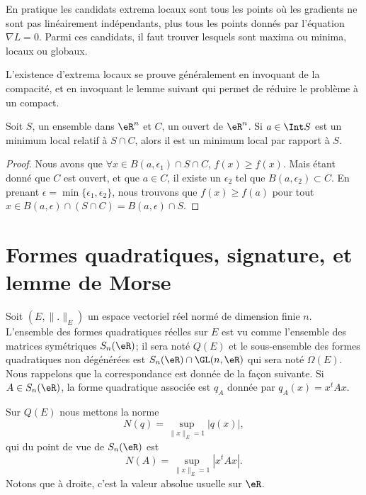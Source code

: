 En pratique les candidats extrema locaux sont tous les points où les gradients ne sont pas linéairement indépendants, plus tous les points donnés par l'équation $\nabla L=0$. Parmi ces candidats, il faut trouver lesquels sont maxima ou minima, locaux ou globaux.

L'existence d'extrema locaux se prouve généralement en invoquant de la compacité, et en invoquant le lemme suivant qui permet de réduire le problème à un compact.

\begin{lemma}		\label{LemmeMinSCimpliqueS}
	Soit $S$, un ensemble dans $\eR^n$ et $C$, un ouvert de $\eR^n$. Si $a\in\Int S$ est un minimum local relatif à $S\cap C$, alors il est un minimum local par rapport à $S$.
\end{lemma}

\begin{proof}
	Nous avons que $\forall x\in B(a,\epsilon_1)\cap S\cap C$, $f(x)\geq f(x)$. Mais étant donné que $C$ est ouvert, et que $a\in C$, il existe un $\epsilon_2$ tel que $B(a,\epsilon_2)\subset C$. En prenant $\epsilon=\min\{ \epsilon_1,\epsilon_2 \}$, nous trouvons que $f(x)\geq f(a)$ pour tout $x\in B(a,\epsilon)\cap(S\cap C)=B(a,\epsilon)\cap S$.
\end{proof}

\section{Formes quadratiques, signature, et lemme de Morse}

Soit \( (E,\| . \|_E)\) un espace vectoriel réel normé de dimension finie \( n\). L'ensemble des formes quadratiques réelles sur \( E\) est vu comme l'ensemble des matrices symétriques \( S_n(\eR)\); il sera noté \( Q(E)\) et le sous-ensemble des formes quadratiques non dégénérées est \( S_n(\eR)\cap\GL(n,\eR)\) qui sera noté \( \Omega(E)\). Nous rappelons que la correspondance est donnée de la façon suivante. Si \( A\in S_n(\eR)\), la forme quadratique associée est \( q_A\) donnée par \( q_A(x)=x^tAx\).

Sur \( Q(E)\) nous mettons la norme
\begin{equation}
    N(q)=\sup_{\| x \|_E=1}| q(x) |,
\end{equation}
qui du point de vue de \( S_n(\eR)\) est
\begin{equation}    \label{EqDOgBNAg}
    N(A)=\sup_{\| x \|_E=1}| x^tAx |.
\end{equation}
Notons que à droite, c'est la valeur absolue usuelle sur \( \eR\).

